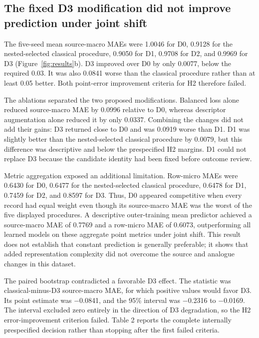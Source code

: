 \documentclass[referee,lineno,pdflatex,sn-vancouver-num]{sn-jnl}
\begin{document}
\subsection{The fixed D3 modification did not improve prediction under joint shift}

The five-seed mean source-macro MAEs were 1.0046 for D0, 0.9128 for the nested-selected classical procedure, 0.9050 for D1, 0.9708 for D2, and 0.9969 for D3 (Figure~\ref{fig:results}b). D3 improved over D0 by only 0.0077, below the required 0.03. It was also 0.0841 worse than the classical procedure rather than at least 0.05 better. Both point-error improvement criteria for H2 therefore failed.

The ablations separated the two proposed modifications. Balanced loss alone reduced source-macro MAE by 0.0996 relative to D0, whereas descriptor augmentation alone reduced it by only 0.0337. Combining the changes did not add their gains: D3 returned close to D0 and was 0.0919 worse than D1. D1 was slightly better than the nested-selected classical procedure by 0.0079, but this difference was descriptive and below the prespecified H2 margins. D1 could not replace D3 because the candidate identity had been fixed before outcome review.

Metric aggregation exposed an additional limitation. Row-micro MAEs were 0.6430 for D0, 0.6477 for the nested-selected classical procedure, 0.6478 for D1, 0.7459 for D2, and 0.8597 for D3. Thus, D0 appeared competitive when every record had equal weight even though its source-macro MAE was the worst of the five displayed procedures. A descriptive outer-training mean predictor achieved a source-macro MAE of 0.7769 and a row-micro MAE of 0.6073, outperforming all learned models on these aggregate point metrics under joint shift. This result does not establish that constant prediction is generally preferable; it shows that added representation complexity did not overcome the source and analogue changes in this dataset.

The paired bootstrap contradicted a favorable D3 effect. The statistic was classical-minus-D3 source-macro MAE, for which positive values would favor D3. Its point estimate was \ensuremath{-}0.0841, and the 95\% interval was \ensuremath{-}0.2316 to \ensuremath{-}0.0169. The interval excluded zero entirely in the direction of D3 degradation, so the H2 error-improvement criterion failed. Table 2 reports the complete internally prespecified decision rather than stopping after the first failed criteria.
\end{document}
